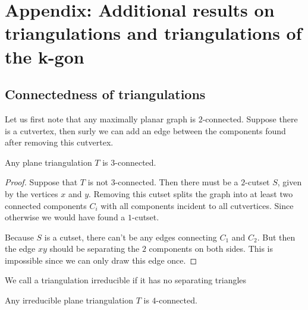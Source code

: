 

\section{Appendix: Additional results on triangulations and triangulations of the k-gon}

\subsection{Connectedness of triangulations}
  Let us first note that any maximally planar graph is $2$-connected. Suppose there is a cutvertex, then surly we can add an edge between the components found after removing this cutvertex.

  \begin{thrm}
    Any plane triangulation $T$ is $3$-connected.
    \label{th:plTri3Connected}
  \end{thrm}

  \begin{proof}
    Suppose that $T$ is not $3$-connected. Then there must be a $2$-cutset $S$, given by the vertices $x$ and $y$. Removing this cutset splits the graph into at least two connected components $C_i$ with all components incident to all cutvertices. Since otherwise we would have found a $1$-cutset.

    Because $S$ is a cutset, there can't be any edges connecting $C_1$ and $C_2$. But then the edge $xy$ should be separating the $2$ components on both sides. This is impossible since we can only draw this edge once.
  \end{proof}

  \begin{defi}
  We call a triangulation irreducible if it has no separating triangles
  \end{defi}


  \begin{thrm}
  Any irreducible plane triangulation $T$ is $4$-connected.
  \end{thrm}

